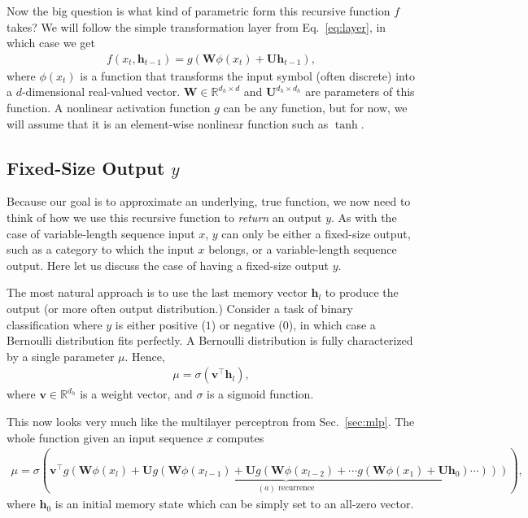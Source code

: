\documentclass{report}
\newcommand{\vect}[1]{\mathbf{#1}}
\newcommand{\matr}[1]{\mathbf{#1}}
\newcommand{\vh}[0]{\vect{h}}
\newcommand{\vv}[0]{\vect{v}}
\newcommand{\mW}[0]{\matr{W}}
\newcommand{\mU}[0]{\matr{U}}
\newcommand{\RR}[0]{\mathbb{R}}
\begin{document}
Now the big question is what kind of parametric form this recursive function $f$
takes? We will follow the simple transformation layer from Eq.~\eqref{eq:layer},
in which case we get
\begin{align}
    \label{eq:rnn_layer}
    f(x_t, \vh_{t-1}) = g(\mW \phi(x_t) + \mU \vh_{t-1}),
\end{align}
where $\phi(x_t)$ is a function that transforms the input symbol (often
discrete) into a $d$-dimensional real-valued vector. $\mW\in \RR^{d_h\times d}$
and $\mU^{d_h \times d_h}$ are parameters of this function. A nonlinear
activation function $g$ can be any function, but for now, we will assume that it
is an element-wise nonlinear function such as $\tanh$.

\subsection{Fixed-Size Output $y$}
\label{sec:rnn_fixed_y}

Because our goal is to approximate an underlying, true function, we now need to
think of how we use this recursive function to {\em return} an output $y$. As
with the case of variable-length sequence input $x$, $y$ can only be either a
fixed-size output, such as a category to which the input $x$ belongs, or a
variable-length sequence output. Here let us discuss the case of having a
fixed-size output $y$.

The most natural approach is to use the last memory vector $\vh_l$ to produce
the output (or more often output distribution.) Consider a task of binary
classification where $y$ is either positive ($1$) or negative ($0$), in which
case a Bernoulli distribution fits perfectly. A Bernoulli distribution is fully
characterized by a single parameter $\mu$. Hence,
\begin{align*}
    \mu = \sigma(\vv^\top \vh_l),
\end{align*}
where $\vv \in \RR^{d_h}$ is a weight vector, and $\sigma$ is a sigmoid
function.

This now looks very much like the multilayer perceptron from Sec.~\ref{sec:mlp}.
The whole function given an input sequence $x$ computes
\begin{align}
    \label{eq:rnn_unrolled}
    \mu = \sigma(\vv^\top 
    \underbrace{
        g(\mW \phi(x_l) + \mU 
        g(\mW \phi(x_{l-1}) + \mU
        g(\mW \phi(x_{l-2}) + \cdots
    g(\mW \phi(x_{1}) + \mU \vh_0) \cdots)))}_{(a) \text{ recurrence}}),
\end{align}
where $\vh_0$ is an initial memory state which can be simply set to an all-zero
vector. 
\end{document}
